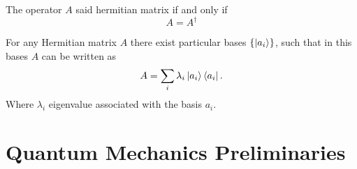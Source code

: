 \begin{defn}

The  operator $A$ said hermitian matrix if and only if $$A=A^\dagger$$
\end{defn}

\begin{prop}\label{DIA}
For any Hermitian matrix $A$ there exist particular  bases $\{\ket{a_i}\}$, such that in this bases  $A$ can be written as\citep*{book:1292540}
\begin{equation}
A=\sum_i \lambda_i \ket{a_i}\bra{a_i}.
\end{equation}
Where $\lambda_i$ eigenvalue associated with the basis $a_i$.
\end{prop}

\section{ Quantum Mechanics Preliminaries }
